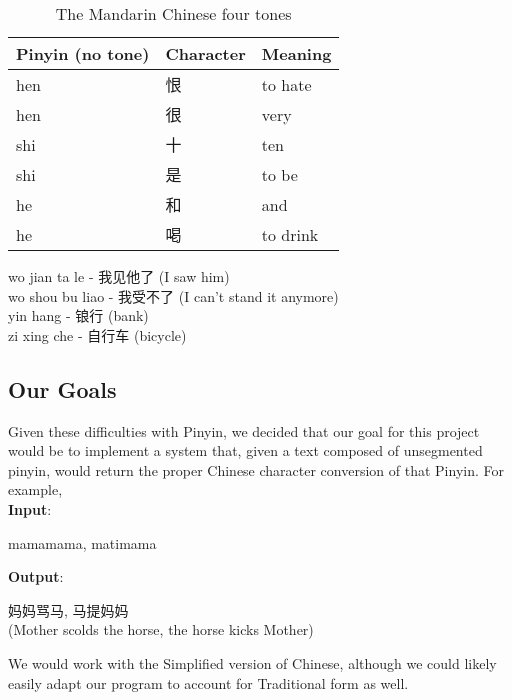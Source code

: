 \documentclass[11pt, twocolumn]{article}
\makeatletter
\newenvironment{problem x}{\@startsection
       {section}
       {1}
       {-.2em}
       {-3.5ex plus -1ex minus -.2ex}
       {2.3ex plus .2ex}
       {\pagebreak[3] %
       \large\bf\noindent{Problem }
       }
       }
       {%
       \begin{center}\large\bf \ldots\ldots\ldots\end{center}}
\makeatother
\begin{document}
\begin{CJK}{UTF8}{gbsn}
\begin{table}
    \begin{centering}
        \begin{tabular}{|l|l|l|} \hline
        Pinyin (no tone)   & Character & Meaning \\ \hline
        hen  & 恨 & to hate \\ 
        hen  & 很 & very \\ 
        shi & 十 & ten\\
        shi & 是 & to be\\
        he & 和 & and\\
        he & 喝 & to drink\\ \hline
        \end{tabular}
        \caption{The Mandarin Chinese four tones}
    \end{centering}
\end{table}
\end{CJK}


\begin{center}
    \begin{CJK}{UTF8}{gbsn}
        wo jian ta le - 我见他了 (I saw him)\\
        wo shou bu liao - 我受不了 (I can't stand it anymore)\\
        yin hang - 锒行 (bank)\\
        zi xing che - 自行车 (bicycle)
    \end{CJK}
\end{center}

\subsection{Our Goals}
Given these difficulties with Pinyin, we decided that our goal for this project would be to implement a system that, given a text composed of unsegmented pinyin, would return the proper Chinese character conversion of that Pinyin. For example,
\\
\textbf{Input}:
\begin{center}
mamamama, matimama
\end{center}
\textbf{Output}:
\begin{center}
    \begin{CJK}{UTF8}{gbsn}
            妈妈骂马, 马提妈妈\\
        (Mother scolds the horse, the horse kicks Mother)
    \end{CJK}
\end{center}
We would work with the Simplified version of Chinese, although we could likely easily adapt our program to account for Traditional form as well.
\end{document}
